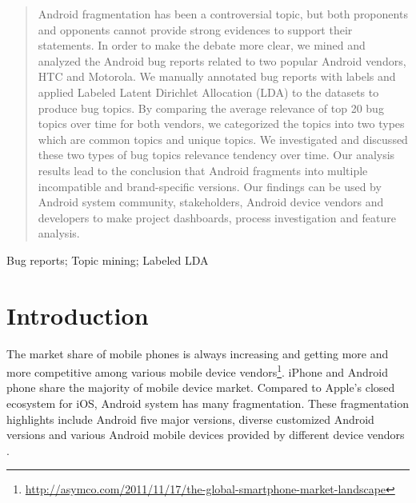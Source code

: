 \documentclass[10pt, conference, compsocconf]{IEEEtran}
\begin{document}
\begin{abstract}
Android fragmentation has been a controversial topic, but both proponents and opponents cannot provide strong evidences to support their statements. In order to make the debate more clear, we mined and analyzed the Android bug reports related to two popular Android vendors, HTC and Motorola. We manually annotated bug reports with labels and applied Labeled Latent Dirichlet Allocation (LDA) to the datasets to produce bug topics. By comparing the average relevance of top 20 bug topics over time for both vendors, we categorized the topics into two types which are common topics and unique topics. We investigated and discussed these two types of bug topics relevance tendency over time. Our analysis results lead to the conclusion that Android fragments into multiple incompatible and brand-specific versions. Our findings can be used by Android system community, stakeholders, Android device vendors and developers to make project dashboards, process investigation and feature analysis.

\end{abstract}

\begin{IEEEkeywords}
Bug reports; Topic mining; Labeled LDA
\end{IEEEkeywords}


%
\IEEEpeerreviewmaketitle



\section{Introduction}
The market share of mobile phones is always increasing and getting more and more competitive among various mobile device vendors\footnote{\url{http://asymco.com/2011/11/17/the-global-smartphone-market-landscape}}. iPhone and Android phone share the majority of mobile device market. Compared to Apple’s closed ecosystem for iOS, Android system has many fragmentation. These fragmentation highlights include Android five major versions, diverse customized Android versions and various Android mobile devices provided by different device vendors \cite{androidfragmentation}.
\end{document}
